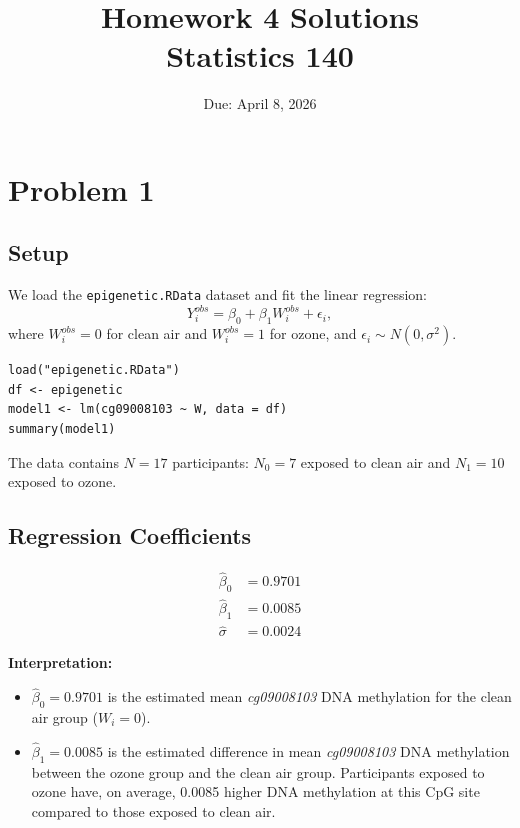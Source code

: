 \documentclass[11pt]{article}
\title{\textbf{Homework 4 Solutions}\\Statistics 140}
\date{Due: April 8, 2026}
\author{}
\begin{document}
\maketitle

\section*{Problem 1}

\subsection*{Setup}

We load the \texttt{epigenetic.RData} dataset and fit the linear regression:
\[
  Y_i^{obs} = \beta_0 + \beta_1 W_i^{obs} + \epsilon_i,
\]
where $W_i^{obs} = 0$ for clean air and $W_i^{obs} = 1$ for ozone, and $\epsilon_i \sim N(0, \sigma^2)$.

\begin{lstlisting}
load("epigenetic.RData")
df <- epigenetic
model1 <- lm(cg09008103 ~ W, data = df)
summary(model1)
\end{lstlisting}

The data contains $N = 17$ participants: $N_0 = 7$ exposed to clean air and $N_1 = 10$ exposed to ozone.

\subsection*{Regression Coefficients}

\begin{align*}
  \hat{\beta}_0 &= 0.9701 \\
  \hat{\beta}_1 &= 0.0085 \\
  \hat{\sigma} &= 0.0024
\end{align*}

\textbf{Interpretation:}
\begin{itemize}
  \item $\hat{\beta}_0 = 0.9701$ is the estimated mean \textit{cg09008103} DNA methylation for the clean air group ($W_i = 0$).
  \item $\hat{\beta}_1 = 0.0085$ is the estimated difference in mean \textit{cg09008103} DNA methylation between the ozone group and the clean air group. Participants exposed to ozone have, on average, 0.0085 higher DNA methylation at this CpG site compared to those exposed to clean air.
\end{itemize}
\end{document}
